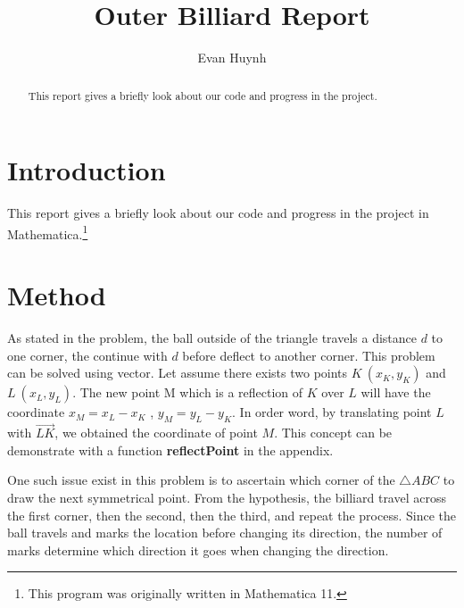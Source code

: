 \documentclass[a4paper,11pt, a4paper]{article}
\begin{document}
\title{Outer Billiard Report}
\author{Evan Huynh}
\maketitle

\begin{abstract}
	This report gives a briefly look about our code and progress in the  project.
\end{abstract}

\tableofcontents
\listoffigures
  
\section{Introduction}
This report gives a briefly look about our code and progress in the  project in Mathematica.\footnote{This program was originally written in Mathematica 11.}

\section{Method}

As stated in the problem, the ball outside of the triangle travels a distance \(d\) to one corner, the continue with \(d\) before deflect to another corner. This problem can be solved using vector. Let assume there exists two points \(K \ (x_K, y_K)\) and \(L\ (x_L, y_L)\). The new point M which is a reflection of \(K\) over \(L\) will have the coordinate \(x_M = x_L - x_K\) , \( y_M = y_L - y_K\). In order word, by translating point \(L\) with \(\overrightarrow{LK}\), we obtained the coordinate of point \(M\). This concept can be demonstrate with a function \textbf{reflectPoint} in the appendix.

One such issue exist in this problem is to ascertain which corner of the \(\triangle ABC\) to draw the next symmetrical point. From the hypothesis, the billiard travel across the first corner, then the second, then the third, and repeat the process. Since the ball travels and marks the location before changing its direction, the number of marks determine which direction it goes when changing the direction.
\end{document}
